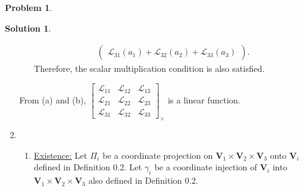 \documentclass{book}
\theoremstyle{definition}
\newtheorem*{prob*}{Problem}
\newtheorem*{sln*}{Solution}
\newcommand{\V}{\mathbf{V}}
\newcommand{\lag}{\mathcal{L}}
\begin{document}
\begin{prob*}
\begin{sln*}
\begin{enumerate}
\begin{enumerate}
\begin{align*}
\begin{pmatrix}
			\lag_{31}(a_1) + \lag_{32}(a_2) + \lag_{33}(a_3)
			\end{pmatrix}.
			\end{align*}
			Therefore, the scalar multiplication condition is also satisfied.\\
			\end{enumerate}
			From (a) and (b), $
			\begin{bmatrix}
			\lag_{11} & \lag_{12} & \lag_{13}\\
			\lag_{21} & \lag_{22} & \lag_{23}\\
			\lag_{31} & \lag_{32} & \lag_{33}
			\end{bmatrix}_\times
			$
			is a linear function.\\
			
			
			
			
			
			
			
			
			
			
			
			
			
			
			
			
			
			\newpage
			\item
			\begin{enumerate}
			\item \underline{Existence:} Let $\Pi_i$ be a coordinate projection on $\V_1 \times \V_2 \times \V_3$ onto $\V_i$ defined in Definition 0.2. Let $\gamma_i$ be a coordinate injection of $\V_i$ into $\V_1 \times \V_2 \times \V_3$ also defined in Definition 0.2. \\
			

\end{enumerate}
\end{enumerate}
\end{sln*}
\end{prob*}
\end{document}
